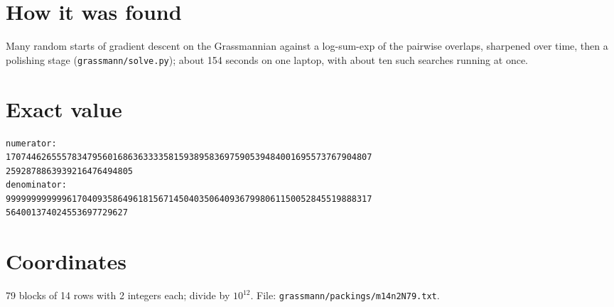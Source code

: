 \documentclass[11pt,a4paper]{article}
\begin{document}
\section{How it was found}
Many random starts of gradient descent on the Grassmannian against a log-sum-exp of the pairwise overlaps, sharpened over time, then a polishing stage (\texttt{grassmann/solve.py}); about 154 seconds on one laptop, with about ten such searches running at once.


\appendix
\section{Exact value}
{\small
\begin{verbatim}
numerator:
170744626555783479560168636333358159389583697590539484001695573767904807
2592878863939216476494805
denominator:
999999999999617040935864961815671450403506409367998061150052845519888317
564001374024553697729627
\end{verbatim}}

\section{Coordinates}
79 blocks of 14 rows with 2 integers each; divide by $10^{12}$. File: \texttt{grassmann/packings/m14n2N79.txt}.
{\tiny
\begin{multicols}{4}
\end{multicols}}
\end{document}
